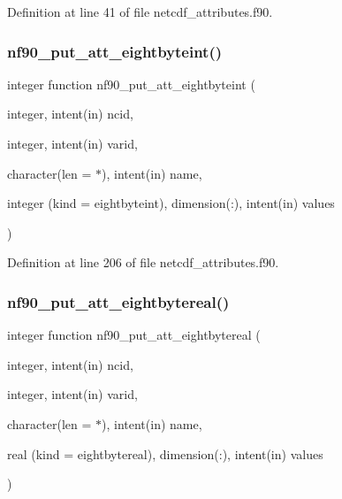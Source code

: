 Definition at line 41 of file netcdf\+\_\+attributes.\+f90.

\mbox{\label{netcdf__attributes_8f90_a8699be7b4a2527c55488c381333f828c}} 
\subsubsection{\texorpdfstring{nf90\+\_\+put\+\_\+att\+\_\+eightbyteint()}{nf90\_put\_att\_eightbyteint()}}
{\footnotesize\ttfamily integer function nf90\+\_\+put\+\_\+att\+\_\+eightbyteint (\begin{DoxyParamCaption}\item[{integer, intent(in)}]{ncid,  }\item[{integer, intent(in)}]{varid,  }\item[{character(len = $\ast$), intent(in)}]{name,  }\item[{integer (kind = eightbyteint), dimension(\+:), intent(in)}]{values }\end{DoxyParamCaption})}



Definition at line 206 of file netcdf\+\_\+attributes.\+f90.

\mbox{\label{netcdf__attributes_8f90_ade183ddaf5b09e6487a3dcf797d2686c}} 
\subsubsection{\texorpdfstring{nf90\+\_\+put\+\_\+att\+\_\+eightbytereal()}{nf90\_put\_att\_eightbytereal()}}
{\footnotesize\ttfamily integer function nf90\+\_\+put\+\_\+att\+\_\+eightbytereal (\begin{DoxyParamCaption}\item[{integer, intent(in)}]{ncid,  }\item[{integer, intent(in)}]{varid,  }\item[{character(len = $\ast$), intent(in)}]{name,  }\item[{real (kind = eightbytereal), dimension(\+:), intent(in)}]{values }\end{DoxyParamCaption})}



